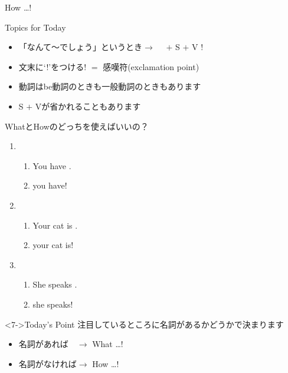 \documentclass[aspectratio=169,xcolor={dvipsnames,table}]{beamer}
\begin{document}
\begin{frame}[plain]{How \ldots ! }
{\begin{block}{Topics for Today}
\begin{itemize}[square]\small
 \item 「なんて～でしょう」というとき$\longrightarrow$\,\,\,%
\,\,\,$+$ S $+$ V !
 \item 文末に`!'をつける\hfill{\scriptsize ! $=$ 感嘆符(exclamation point)}
 \item 動詞はbe動詞のときも一般動詞のときもあります
 \item S $+$ Vが省かれることもあります
\end{itemize}
     \end{block}
}
\vspace*{-10pt}
\hfill\hyperlink{WHAT}{}
\hypertarget{HOW}{}
\end{frame}
\begin{frame}[plain]{WhatとHowのどっちを使えばいいの？}
 \begin{enumerate}
  \item<1-> \begin{enumerate}
	 \item<1-> You have .
	 \item<2->  you have!
	\end{enumerate}
  \item<3-> \begin{enumerate}
	 \item<3-> Your cat is .
	 \item<4->  your cat is!
	\end{enumerate}
  \item<5-> \begin{enumerate}
	 \item<5-> She speaks .
	 \item<6->  she speaks!
	\end{enumerate}
 \end{enumerate}

\begin{block}<7->{Today's Point}\small
注目しているところに名詞があるかどうかで決まります
\begin{itemize}[square]\small
 \item 名詞があれば　$\longrightarrow$ What \ldots !
 \item 名詞がなければ$\longrightarrow$ How \ldots !
\end{itemize}
\end{block}
\vspace*{-5pt}
\hfill{\scriptsize {}}

\hfill\hyperlink{HOW}{}%
\hspace{10pt}\hyperlink{WHAT}{}

\end{frame}
\end{document}
